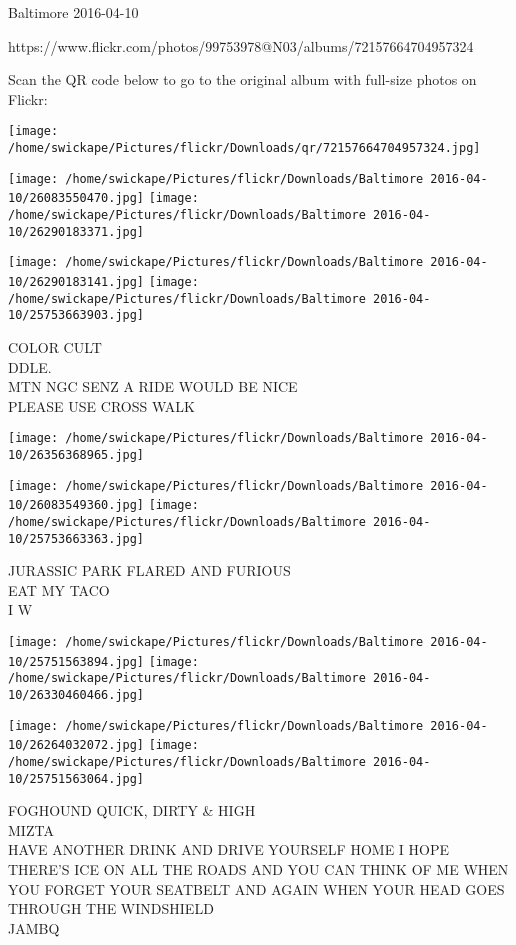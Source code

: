 \documentclass[10pt,letterpaper]{article}
\begin{document}
Baltimore 2016-04-10

https://www.flickr.com/photos/99753978@N03/albums/72157664704957324

Scan the QR code below to go to the original album with full-size photos on Flickr:

\texttt{[image: /home/swickape/Pictures/flickr/Downloads/qr/72157664704957324.jpg]}
\pagebreak

\texttt{[image: /home/swickape/Pictures/flickr/Downloads/Baltimore 2016-04-10/26083550470.jpg]}
\texttt{[image: /home/swickape/Pictures/flickr/Downloads/Baltimore 2016-04-10/26290183371.jpg]}

\texttt{[image: /home/swickape/Pictures/flickr/Downloads/Baltimore 2016-04-10/26290183141.jpg]}
\texttt{[image: /home/swickape/Pictures/flickr/Downloads/Baltimore 2016-04-10/25753663903.jpg]}

COLOR CULT\\
DDLE.\\
MTN NGC SENZ A RIDE WOULD BE NICE\\
PLEASE USE CROSS WALK
\pagebreak

\texttt{[image: /home/swickape/Pictures/flickr/Downloads/Baltimore 2016-04-10/26356368965.jpg]}

\vspace{0.25in}
\texttt{[image: /home/swickape/Pictures/flickr/Downloads/Baltimore 2016-04-10/26083549360.jpg]}
\texttt{[image: /home/swickape/Pictures/flickr/Downloads/Baltimore 2016-04-10/25753663363.jpg]}

JURASSIC PARK FLARED AND FURIOUS\\
EAT MY TACO\\
I W
\pagebreak

\texttt{[image: /home/swickape/Pictures/flickr/Downloads/Baltimore 2016-04-10/25751563894.jpg]}
\texttt{[image: /home/swickape/Pictures/flickr/Downloads/Baltimore 2016-04-10/26330460466.jpg]}

\texttt{[image: /home/swickape/Pictures/flickr/Downloads/Baltimore 2016-04-10/26264032072.jpg]}
\texttt{[image: /home/swickape/Pictures/flickr/Downloads/Baltimore 2016-04-10/25751563064.jpg]}

FOGHOUND QUICK, DIRTY \& HIGH\\
MIZTA\\
HAVE ANOTHER DRINK AND DRIVE YOURSELF HOME I HOPE THERE'S ICE ON ALL THE ROADS AND YOU CAN THINK OF ME WHEN YOU FORGET YOUR SEATBELT AND AGAIN WHEN YOUR HEAD GOES THROUGH THE WINDSHIELD\\
JAMBQ
\pagebreak
\end{document}
